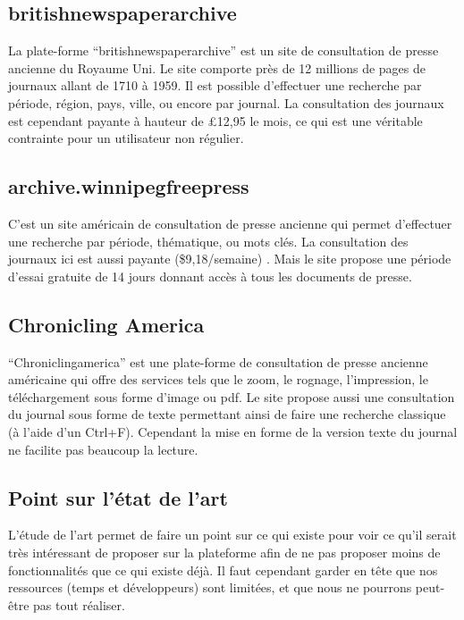         \subsection{britishnewspaperarchive}
        \label{subsec:britishnewspaper}
        La plate-forme “britishnewspaperarchive” est un site de consultation de presse ancienne du Royaume Uni.
        Le site comporte près de 12 millions de pages de journaux allant de 1710 à 1959. Il est possible
        d’effectuer une recherche par période, région, pays, ville, ou encore par journal. La consultation
        des journaux est cependant payante à hauteur de £12,95 le mois, ce qui est une véritable contrainte
        pour un utilisateur non régulier.

        \subsection{archive.winnipegfreepress}
        \label{subsec:winnipeg}
        C’est un site américain de consultation de presse ancienne qui permet d’effectuer une recherche par période,
        thématique, ou mots clés. La consultation des journaux ici  est aussi payante
        (\$9,18/semaine) . Mais le site propose une période d’essai gratuite de 14 jours donnant accès à tous les documents de presse.

        \subsection{Chronicling America}
        \label{subsec:chrinamerica}
        “Chroniclingamerica” est une plate-forme de consultation de presse ancienne américaine qui offre des services
        tels que le zoom, le rognage, l’impression, le téléchargement sous forme d’image ou pdf. Le site propose
        aussi une consultation du journal sous forme de texte permettant ainsi de faire une recherche classique
        (à l’aide d’un Ctrl+F). Cependant la mise en forme de la version texte du journal ne facilite pas beaucoup la lecture.


    \subsection{Point sur l’état de l’art}
    \label{sec:point}
    L’étude de l’art permet de faire un point sur ce qui existe pour voir ce qu’il serait très intéressant de proposer
    sur la plateforme afin de ne pas proposer moins de fonctionnalités que ce qui existe déjà. Il faut cependant garder
    en tête que nos ressources (temps et développeurs) sont limitées, et que nous ne pourrons peut-être pas tout réaliser.

